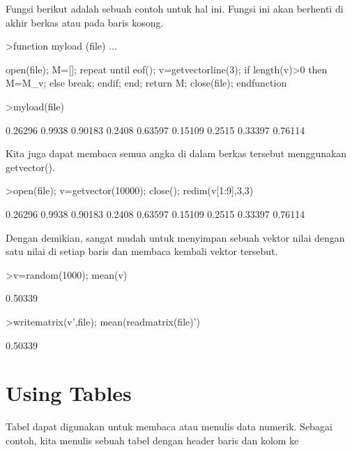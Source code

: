 \documentclass{article}
\newenvironment{eulernotebook}{\par}{\par}
\newcommand{\eulerheading}[1]{\section{#1}}
\newenvironment{eulercomment}{\par\medskip}{\par\medskip}
\begin{document}
\begin{eulernotebook}
\begin{eulercomment}
\begin{eulercomment}
\begin{eulercomment}
\begin{eulercomment}
\begin{eulercomment}
\begin{eulercomment}
\begin{eulercomment}
Fungsi berikut adalah sebuah contoh untuk hal ini. Fungsi ini akan
berhenti di akhir berkas atau pada baris kosong.
\end{eulercomment}
\begin{eulerprompt}
>function myload (file) ...
\end{eulerprompt}
\begin{eulerudf}
  open(file);
  M=[];
  repeat
     until eof();
     v=getvectorline(3);
     if length(v)>0 then M=M_v; else break; endif;
  end;
  return M;
  close(file);
  endfunction
\end{eulerudf}
\begin{eulerprompt}
>myload(file)
\end{eulerprompt}
\begin{euleroutput}
    0.26296    0.9938   0.90183 
     0.2408   0.63597   0.15109 
     0.2515   0.33397   0.76114 
\end{euleroutput}
\begin{eulercomment}
Kita juga dapat membaca semua angka di dalam berkas tersebut
menggunakan getvector().
\end{eulercomment}
\begin{eulerprompt}
>open(file); v=getvector(10000); close(); redim(v[1:9],3,3)
\end{eulerprompt}
\begin{euleroutput}
    0.26296    0.9938   0.90183 
     0.2408   0.63597   0.15109 
     0.2515   0.33397   0.76114 
\end{euleroutput}
\begin{eulercomment}
Dengan demikian, sangat mudah untuk menyimpan sebuah vektor nilai
dengan satu nilai di setiap baris dan membaca kembali vektor tersebut.
\end{eulercomment}
\begin{eulerprompt}
>v=random(1000); mean(v)
\end{eulerprompt}
\begin{euleroutput}
  0.50339
\end{euleroutput}
\begin{eulerprompt}
>writematrix(v',file); mean(readmatrix(file)')
\end{eulerprompt}
\begin{euleroutput}
  0.50339
\end{euleroutput}
\eulerheading{Using Tables}
\begin{eulercomment}
Tabel dapat digunakan untuk membaca atau menulis data numerik. Sebagai
contoh, kita menulis sebuah tabel dengan header baris dan kolom ke

\end{eulercomment}
\end{eulercomment}
\end{eulercomment}
\end{eulercomment}
\end{eulercomment}
\end{eulercomment}
\end{eulercomment}
\end{eulernotebook}
\end{document}
